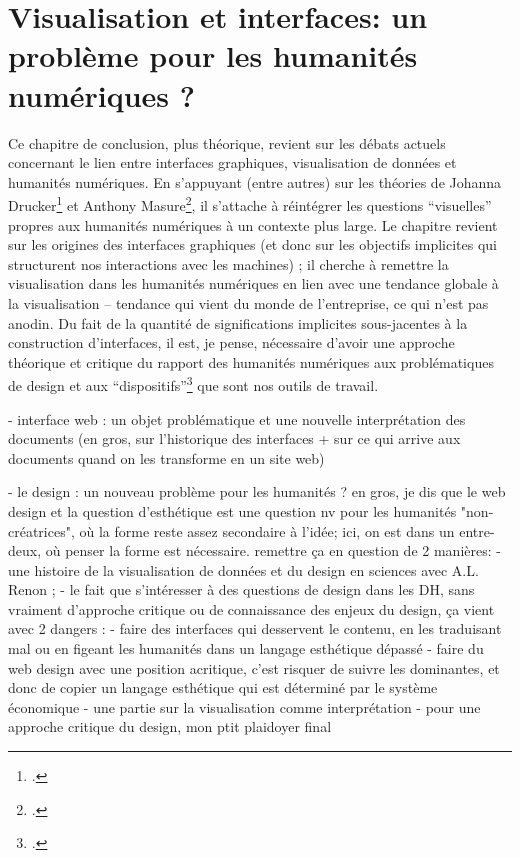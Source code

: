 \documentclass[a4paper, 12pt, twoside]{book}
\begin{document}
\chapter{Visualisation et interfaces: un problème pour les humanités numériques ?}
Ce chapitre de conclusion, plus théorique, revient sur les débats actuels concernant le lien entre interfaces graphiques, visualisation de données et humanités numériques. En s'appuyant (entre autres) sur les théories de Johanna Drucker\footcite{drucker_visualisation_2020} et Anthony Masure\footcite{masure_design_2017}, il s'attache à réintégrer les questions \enquote{visuelles} propres aux humanités numériques à un contexte plus large. Le chapitre revient sur les origines des interfaces graphiques (et donc sur les objectifs implicites qui structurent nos interactions avec les machines) ; il cherche à remettre la visualisation dans les humanités numériques en lien avec une tendance globale à la visualisation -- tendance qui vient du monde de l'entreprise, ce qui n'est pas anodin. Du fait de la quantité de significations implicites sous-jacentes à la construction d'interfaces, il est, je pense, nécessaire d'avoir une approche théorique et critique du rapport des humanités numériques aux problématiques de design et aux \enquote{dispositifs}\footcite{agamben_what_2009} que sont nos outils de travail.

- interface web : un objet problématique et une nouvelle interprétation des documents (en gros, sur l'historique des interfaces + sur ce qui arrive aux documents quand on les transforme en un site web)

- le design : un nouveau problème pour les humanités ? en gros, je dis que le web design et la question d'esthétique est une question nv pour les humanités "non-créatrices", où la forme reste assez secondaire à l'idée; ici, on est dans un entre-deux, où penser la forme est nécessaire. remettre ça en question de 2 manières: 
	- une histoire de la visualisation de données et du design en sciences avec A.L. Renon ; 
	- le fait que s'intéresser à des questions de design dans les DH, sans vraiment d'approche critique ou de connaissance des enjeux du design, ça vient avec 2 dangers :
		- faire des interfaces qui desservent le contenu, en les traduisant mal ou en figeant les humanités dans un langage esthétique dépassé
		- faire du web design avec une position acritique, c'est risquer de suivre les dominantes, et donc de copier un langage esthétique qui est déterminé par le système économique
- une partie sur la visualisation comme interprétation
- pour une approche critique du design, mon ptit plaidoyer final
\end{document}
